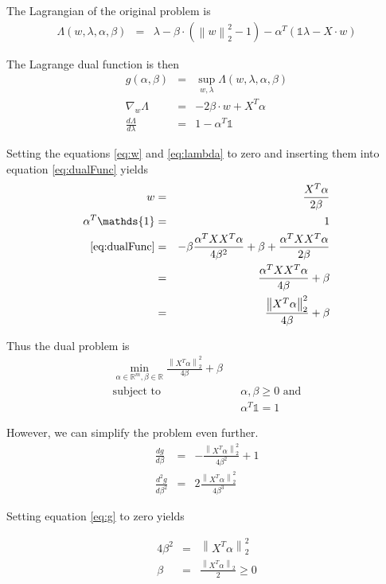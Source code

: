 \documentclass[a4paper, 11pt, titlepage]{article}
\newcommand{\norm}[1]{\left\lVert#1\right\rVert}
\begin{document}
The Lagrangian of the original problem is
\begin{eqnarray*}
	\Lambda(w,\lambda,\alpha,\beta) &=& \lambda - \beta\cdot (\norm{w}_2^2-1) - \alpha^T(\mathds{1}\lambda - X\cdot w)
\end{eqnarray*}

The Lagrange dual function is then 
\begin{eqnarray}
	g(\alpha,\beta) &=& \sup_{w,\lambda} \Lambda(w,\lambda,\alpha,\beta) \label{eq:dualFunc}\\
	\nabla_w \Lambda &=& -2\beta\cdot w+X^T\alpha\label{eq:w}\\
	\frac{d\Lambda}{d\lambda} &=& 1 - \alpha^T\mathds{1}\label{eq:lambda}
\end{eqnarray}

Setting the equations \eqref{eq:w} and \eqref{eq:lambda} to zero and inserting them into equation \eqref{eq:dualFunc} yields
\begin{eqnarray}
	w &=& \frac{X^T\alpha}{2\beta} \label{eq:c1}\\
	\alpha^T\mathds{1} &=& 1 \label{eq:c2}\\
	\eqref{eq:dualFunc} &=& -\beta \frac{\alpha^TXX^T\alpha}{4\beta^2} + \beta +\frac{\alpha^TXX^T\alpha}{2\beta}\nonumber\\
	&=& \frac{\alpha^TXX^T\alpha}{4\beta} + \beta\nonumber\\
	&=& \frac{\norm{X^T\alpha}_2^2}{4\beta} + \beta\nonumber
\end{eqnarray}

Thus the dual problem is
\begin{eqnarray*}
	\min_{\alpha \in \mathbb{R}^m, \beta \in \mathbb{R}} \frac{\norm{X^T\alpha}_2^2}{4\beta} + \beta&&\\
	\text{subject to} && \alpha,\beta \ge 0 \text{ and}\\
	&& \alpha^T\mathds{1} = 1		
\end{eqnarray*}

However, we can simplify the problem even further.
\begin{eqnarray}
	\frac{d g}{d\beta} &=& -\frac{\norm{X^T\alpha}_2^2}{4\beta^2} + 1 \label{eq:g}\\
	\frac{d^2 g}{d\beta^2} &=& 2\frac{\norm{X^T\alpha}_2^2}{4\beta^3}\label{eq:g2}
\end{eqnarray}

Setting equation \eqref{eq:g} to zero yields

\begin{eqnarray}
	4\beta^2 &=& \norm{X^T\alpha}_2^2\nonumber \\
	\beta &=& \frac{\norm{X^T\alpha}_2}{2} \ge 0 \label{eq:beta}
\end{eqnarray}
\end{document}
